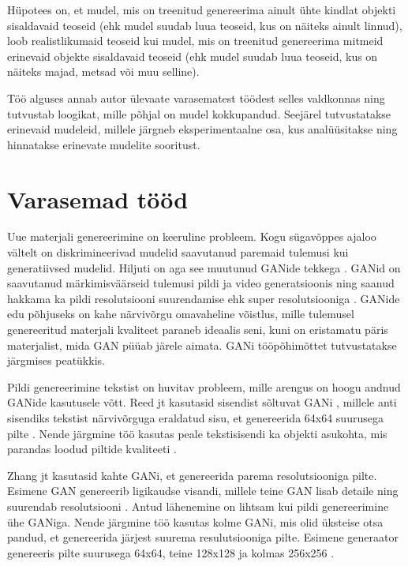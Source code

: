 \documentclass{vilgym}
\begin{document}
	Hüpotees on, et mudel, mis on treenitud genereerima ainult ühte kindlat objekti sisaldavaid teoseid (ehk mudel suudab luua teoseid, kus on näiteks ainult linnud), loob realistlikumaid teoseid kui mudel, mis on treenitud genereerima mitmeid erinevaid objekte sisaldavaid teoseid (ehk mudel suudab luua teoseid, kus on näiteks majad, metsad või muu selline).

	Töö alguses annab autor ülevaate varasematest töödest selles valdkonnas ning tutvustab loogikat, mille põhjal on mudel kokkupandud. Seejärel tutvustatakse erinevaid mudeleid, millele järgneb eksperimentaalne osa, kus analüüsitakse ning hinnatakse erinevate mudelite sooritust. 
	
	\section{Varasemad tööd}

	Uue materjali genereerimine on keeruline probleem. Kogu sügavõppes ajaloo vältelt on diskrimineerivad mudelid saavutanud paremaid tulemusi kui generatiivsed mudelid. Hiljuti on aga see muutunud GANide tekkega \parencite{gan}. GANid on saavutanud märkimisväärseid tulemusi pildi \parencite{biggan} ja video generatsioonis \parencite{dvdgan} ning saanud hakkama ka pildi resolutsiooni suurendamise ehk super resolutsiooniga \parencite{srgan}. GANide edu põhjuseks on kahe närvivõrgu omavaheline võistlus, mille tulemusel genereeritud materjali kvaliteet paraneb ideaalis seni, kuni on eristamatu päris materjalist, mida GAN püüab järele aimata. GANi tööpõhimõttet tutvustatakse järgmises peatükkis.

	Pildi genereerimine tekstist on huvitav probleem, mille arengus on hoogu andnud GANide kasutusele võtt. Reed jt kasutasid sisendist sõltuvat GANi , millele anti sisendiks tekstist närvivõrguga eraldatud sisu, et genereerida 64x64 suurusega pilte \parencite{reed}. Nende järgmine töö kasutas peale tekstisisendi ka objekti asukohta, mis parandas loodud piltide kvaliteeti \parencite{reed2}. 

	Zhang jt kasutasid kahte GANi, et genereerida parema resolutsiooniga pilte. Esimene GAN genereerib ligikaudse visandi, millele teine GAN lisab detaile ning suurendab resolutsiooni \parencite{stackgan}. Antud lähenemine on lihtsam kui pildi genereerimine ühe GANiga. Nende järgmine töö kasutas kolme GANi, mis olid üksteise otsa pandud, et genereerida järjest suurema resulutsiooniga pilte. Esimene generaator genereeris pilte suurusega 64x64, teine 128x128 ja kolmas 256x256 \parencite{stackgan2}.
\end{document}

